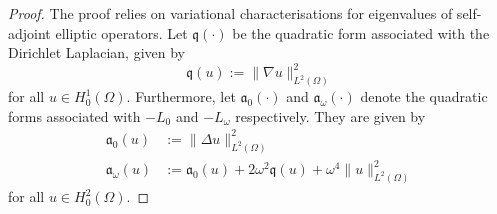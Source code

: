 \documentclass[a4paper, reqno,titlepage]{amsart}
\numberwithin{equation}{section}
\theoremstyle{plain}
\theoremstyle{definition}
\theoremstyle{remark}
\newcommand{\mfra}{\mathfrak{a}}
\newcommand{\mfrq}{\mathfrak{q}}
\begin{document}
\begin{proof}
  The proof relies on variational characterisations for eigenvalues of self-adjoint elliptic operators. Let $\mfrq(\cdot)$ be the quadratic form associated with the Dirichlet Laplacian, given by
  \begin{equation*}
    \mfrq(u):=\|\nabla u\|_{L^2(\Omega)}^2
  \end{equation*}
  for all $u\in H_0^1(\Omega)$. Furthermore, let $\mfra_0(\cdot)$ and $\mfra_\omega(\cdot)$ denote the quadratic forms associated with $-L_0$ and $-L_\omega$ respectively. They are given by
  \begin{equation*}
    \begin{aligned}
      \mfra_0(u)      & := \|\Delta u\|_{L^2(\Omega)}^2                                   \\
      \mfra_\omega(u) & := \mfra_0(u) + 2 \omega^2\mfrq(u)+\omega^4 \|u\|_{L^2(\Omega)}^2
    \end{aligned}
  \end{equation*}
  for all $u\in H_0^2(\Omega)$.


\end{proof}
\end{document}
